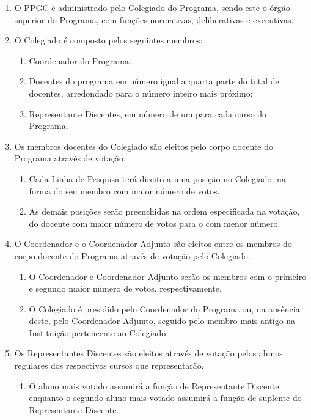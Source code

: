 \documentclass{article}
\newcommand{\singleitem}{\item[Parágrafo Único.]}
\begin{document}
\begin{enumerate}

	\item O PPGC é administrado pelo Colegiado do Programa, sendo este o órgão superior do Programa, com funções normativas, deliberativas e executivas.	%

	\item O Colegiado é composto pelos seguintes membros:
	\begin{enumerate}[label=\Roman*]
		\item Coordenador do Programa.
		\item Docentes do programa em número igual a quarta parte do total de docentes, arredondado para o número inteiro mais próximo;
		\item Representante Discentes, em número de um para cada curso do Programa.
	\end{enumerate}

	\item Os membros docentes do Colegiado são eleitos pelo corpo docente do Programa através de votação.
	\begin{enumerate}
		\item Cada Linha de Pesquisa terá direito a uma posição no Colegiado, na forma do seu membro com maior número de votos.
		\item As demais posições serão preenchidas na ordem especificada na votação, do docente com maior número de votos para o com menor número.
	\end{enumerate}

	\item O Coordenador e o Coordenador Adjunto são eleitos entre os membros do corpo docente do Programa através de votação pelo Colegiado. 
	\begin{enumerate}
		\item O Coordenador e Coordenador Adjunto serão os membros com o primeiro e segundo maior número de votos, respectivamente.
		\item O Colegiado é presidido pelo Coordenador do Programa ou, na ausência deste, pelo Coordenador Adjunto, seguido pelo membro mais antigo na Instituição pertencente ao Colegiado.
	\end{enumerate}

	\item Os Representantes Discentes são eleitos através de votação pelos alunos regulares dos respectivos cursos que representarão.
	\begin{enumerate}
		\singleitem O aluno mais votado assumirá a função de Representante Discente enquanto o segundo aluno mais votado assumirá a função de suplente do Representante Discente.
	\end{enumerate}	

\end{enumerate}
\end{document}
